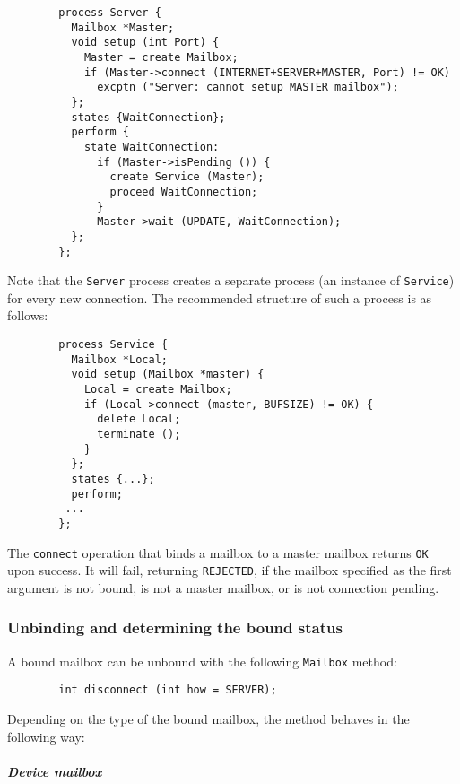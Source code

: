 \begin{verbatim}
        process Server {
          Mailbox *Master;
          void setup (int Port) {
            Master = create Mailbox;
            if (Master->connect (INTERNET+SERVER+MASTER, Port) != OK)
              excptn ("Server: cannot setup MASTER mailbox");
          };
          states {WaitConnection};
          perform {
            state WaitConnection:
              if (Master->isPending ()) {
                create Service (Master);
                proceed WaitConnection;
              }
              Master->wait (UPDATE, WaitConnection);
          };
        };
\end{verbatim}

Note that the {\tt Server} process creates a separate process (an instance
of {\tt Service}) for every new connection.
The recommended structure of such a process is as follows:

\begin{verbatim}
        process Service {
          Mailbox *Local;
          void setup (Mailbox *master) {
            Local = create Mailbox;
            if (Local->connect (master, BUFSIZE) != OK) {
              delete Local;
              terminate ();
            }
          };
          states {...};
          perform;
         ...
        };
\end{verbatim}

\medskip

\noindent
The {\tt connect} operation that binds a mailbox to a master mailbox
returns {\tt OK} upon success.
It will fail, returning {\tt REJECTED}, if the mailbox specified as the
first argument is not bound, is not a master mailbox, or is not
connection pending.

\subsubsection{Unbinding and determining the bound status}
\label{rm_mb_bo_ub}

A bound mailbox can be unbound with the following {\tt Mailbox} method:
\begin{verbatim}
        int disconnect (int how = SERVER);
\end{verbatim}

Depending on the type of the bound mailbox, the method behaves in
the following way:

\subparagraph*{Device mailbox}\mbox{~}\vspace{0.1in}

